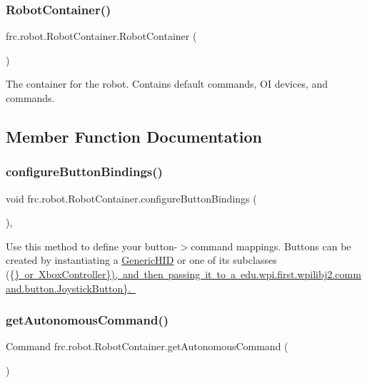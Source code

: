 \subsubsection{\texorpdfstring{RobotContainer()}{RobotContainer()}}
{\footnotesize\ttfamily frc.\+robot.\+Robot\+Container.\+Robot\+Container (\begin{DoxyParamCaption}{ }\end{DoxyParamCaption})\hspace{0.3cm}{\ttfamily [inline]}}

The container for the robot. Contains default commands, OI devices, and commands. 

\subsection{Member Function Documentation}
\mbox{\label{classfrc_1_1robot_1_1_robot_container_a1660efe4ee6c6282a49820cc74259eb5}} 
\subsubsection{\texorpdfstring{configureButtonBindings()}{configureButtonBindings()}}
{\footnotesize\ttfamily void frc.\+robot.\+Robot\+Container.\+configure\+Button\+Bindings (\begin{DoxyParamCaption}{ }\end{DoxyParamCaption})\hspace{0.3cm}{\ttfamily [inline]}, {\ttfamily [private]}}

Use this method to define your button-\/$>$command mappings. Buttons can be created by instantiating a \mbox{\hyperlink{}{Generic\+H\+ID}} or one of its subclasses (\{\mbox{\hyperlink{}{\} or  Xbox\+Controller\}), and then passing it to a  edu.\+wpi.\+first.\+wpilibj2.\+command.\+button.\+Joystick\+Button\}. }}\mbox{\label{classfrc_1_1robot_1_1_robot_container_ac61d2476e65873e263f844c1c721a82e}} 
\subsubsection{\texorpdfstring{getAutonomousCommand()}{getAutonomousCommand()}}
{\footnotesize\ttfamily Command frc.\+robot.\+Robot\+Container.\+get\+Autonomous\+Command (\begin{DoxyParamCaption}{ }\end{DoxyParamCaption})\hspace{0.3cm}{\ttfamily [inline]}}

